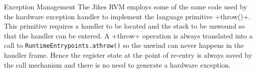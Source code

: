 \begin{section}{Exception Management}
The Jikes RVM employs some of the same code used by the hardware exception handler to implement the language primitive \spverb+throw()+. This primitive requires a handler to be located and the stack to be unwound so that the handler can be entered. A \spverb+throw+ operation is always translated into a call to \texttt{Run\-ti\-me\-En\-try\-points.a\-throw()} so the unwind can never happens in the handler frame. Hence the register state at the point of re-entry is always saved by the call mechanism and there is no need to generate a hardware exception.

\end{section}
